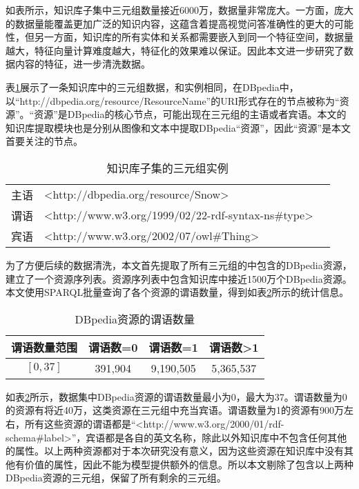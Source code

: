 如表所示，知识库子集中三元组数量接近6000万，数据量非常庞大。一方面，庞大的数据量能覆盖更加广泛的知识内容，这蕴含着提高视觉问答准确性的更大的可能性，但另一方面，知识库的所有实体和关系都需要嵌入到同一个特征空间，数据量越大，特征向量计算难度越大，特征化的效果难以保证。因此本文进一步研究了数据内容的特征，进一步清洗数据。

表\ref{dbpediasamples}展示了一条知识库中的三元组数据，和实例相同，在DBpedia中，以“http://dbpedia.org/resource/ResourceName”的URI形式存在的节点被称为“资源”。“资源”是DBpedia的核心节点，可能出现在三元组的主语或者宾语。本文的知识库提取模块也是分别从图像和文本中提取DBpedia“资源”，因此“资源”是本文首要关注的节点。

\begin{table}[H]
\centering
\caption{知识库子集的三元组实例}
\begin{tabular}{lll}
\toprule
主语 & <http://dbpedia.org/resource/Snow> \\
谓语 & <http://www.w3.org/1999/02/22-rdf-syntax-ns\#type> \\
宾语 & <http://www.w3.org/2002/07/owl\#Thing>\\
\bottomrule
\end{tabular}
\label{dbpediasamples}
\end{table}

为了方便后续的数据清洗，本文首先提取了所有三元组的中包含的DBpedia资源，建立了一个资源序列表。资源序列表中包含知识库中接近1500万个DBpedia资源。本文使用SPARQL批量查询了各个资源的谓语数量，得到如表\ref{predicateNum}所示的统计信息。

\begin{table}[H]
\centering
\caption{DBpedia资源的谓语数量}
\begin{tabular}{cccc}
\toprule
谓语数量范围 & 谓语数=0 & 谓语数=1 & 谓语数>1\\
\midrule
$[0, 37]$ &  391,904 &  9,190,505 & 5,365,537\\
\bottomrule
\end{tabular}
\label{predicateNum}
\end{table}

如表\ref{predicateNum}所示，数据集中DBpedia资源的谓语数量最小为0，最大为37。谓语数量为0的资源有将近40万，这类资源在三元组中充当宾语。谓语数量为1的资源有900万左右，所有这些资源的谓语都是“<http://www.w3.org/2000/01/rdf-schema\#label>”，宾语都是各自的英文名称，除此以外知识库中不包含任何其他的属性。以上两种资源都对于本次研究没有意义，因为这些资源在知识库中没有其他有价值的属性，因此不能为模型提供额外的信息。所以本文剔除了包含以上两种DBpedia资源的三元组，保留了所有剩余的三元组。

